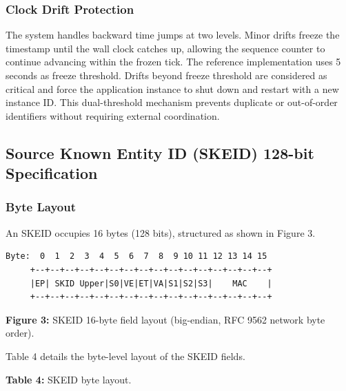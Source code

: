 \documentclass[fleqn,10pt]{wlpeerj}
\begin{document}
\subsubsection{Clock Drift Protection}\label{clock-drift-protection}

The system handles backward time jumps at two levels. Minor drifts
freeze the timestamp until the wall clock catches up, allowing the
sequence counter to continue advancing within the frozen tick. The
reference implementation uses 5 seconds as freeze threshold. Drifts
beyond freeze threshold are considered as critical and force the
application instance to shut down and restart with a new instance ID.
This dual-threshold mechanism prevents duplicate or out-of-order
identifiers without requiring external coordination.

\newpage

\subsection{Source Known Entity ID (SKEID) 128-bit
Specification}\label{source-known-entity-id-skeid-128-bit-specification}

\subsubsection{Byte Layout}\label{byte-layout}

An SKEID occupies 16 bytes (128 bits), structured as shown in Figure 3.

\begin{verbatim}
Byte:  0  1  2  3  4  5  6  7  8  9 10 11 12 13 14 15
     +--+--+--+--+--+--+--+--+--+--+--+--+--+--+--+--+
     |EP| SKID Upper|S0|VE|ET|VA|S1|S2|S3|    MAC    |
     +--+--+--+--+--+--+--+--+--+--+--+--+--+--+--+--+
\end{verbatim}

\textbf{Figure 3:} SKEID 16-byte field layout (big-endian, RFC 9562
network byte order).

Table 4 details the byte-level layout of the SKEID fields.

\textbf{Table 4:} SKEID byte layout.
\end{document}
